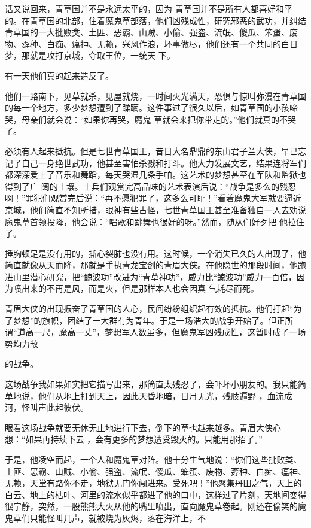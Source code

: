 \documentclass{article}
\begin{document}
话又说回来，青草国并不是永远太平的，因为
\newpage
青草国并不是所有人都喜好和平的。在青草国的北部，住着魔鬼草部落，他们凶残成性，研究邪恶的武功，并纠结青草国的一大批败类、土匪、恶霸、山贼、小偷、强盗、流氓、傻瓜、笨蛋、废物、孬种、白痴、瘟神、无赖，兴风作浪，坏事做尽，他们还有一个共同的白日梦，那就是攻打京城，夺取王位，一统天
下。 


有一天他们真的起来造反了。 

他们一路南下，见草就杀，见屋就烧，一时间火光满天，恐惧与惊叫弥漫在青草国的每一个地方，多少梦想遭到了蹂躏。这件事过了很久以后，如青草国的小孩啼哭，母亲们就会说：“如果你再哭，魔鬼
草就会来把你带走的。”他们就真的不哭了。 

必须有人起来抵抗。但是七世青草国王，昔日大名鼎鼎的东山君子兰大侠，早已忘记了自己一身绝世武功，他甚至害怕杀戮和打斗。他大力发展文艺，结果连将军们都深深爱上了音乐和舞蹈，每天哭湿几条手帕。这艺术的梦想甚至在军队和监狱也得到了广
\newpage
阔的土壤。士兵们观赏完高品味的艺术表演后说：“战争是多么的残忍啊！”罪犯们观赏完后说：“再不愿犯罪了，这多么可耻！”看着魔鬼大军就要逼近京城，他们简直不知所措，眼神有些古怪，七世青草国王甚至准备独自一人去劝说魔鬼草首领投降，他会说：“唱歌和跳舞也很好的呀。”然而，随从们好歹把
他拉住了。 

捶胸顿足是没有用的，撕心裂肺也没有用。这时候，一个消失已久的人出现了，他简直就像从天而降，那就是手执青龙宝剑的青眉大侠。在他隐世的那段时间，他跑进山里潜心研究，把“鲸波功”改进为“青草神功”，威力比“鲸波功”威力一百倍，因为喷出来的不再是风，而是火，但是那样本人也会因真
气耗尽而死。 

青眉大侠的出现振奋了青草国的人心，民间纷纷组织起有效的抵抗。他们打起“为了梦想”的旗帜，团结了一大群有为青年。于是一场浩大的战争开始了。但正所谓“道高一尺，魔高一丈”，梦想军人数虽多，但魔鬼军凶残成性，这暂时成了一场势均力敌
\newpage

的战争。 

这场战争我如果如实把它描写出来，那简直太残忍了，会吓坏小朋友的。我只能简单地说，他们从地上打到天上，因此天昏地暗，日月无光，残肢遍野
，血流成河，怪叫声此起彼伏。 

眼看这场战争就要无休无止地进行下去，倒下的草也越来越多。青眉大侠心想：“如果再持续下去
，会有更多的梦想遭受毁灭的。只能用那招了。” 

于是，他凌空而起，一个人和魔鬼草对阵。他十分生气地说：“你们这些批败类、土匪、恶霸、山贼、小偷、强盗、流氓、傻瓜、笨蛋、废物、孬种、白痴、瘟神、无赖，天堂有路你不走，地狱无门你闯进来。受死吧！”他聚集丹田之气，天上的白云、地上的枯叶、河里的流水似乎都进了他的口中，这样过了片刻，天地间变得很宁静，突然，一股熊熊大火从他的嘴里喷出，直向魔鬼草卷起。刚还在偷笑的魔鬼草们只能怪叫几声，就被烧为灰烬，落在海洋上，不
\end{document}
